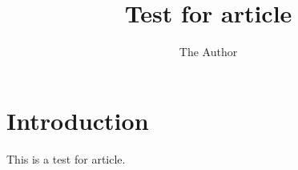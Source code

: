 \documentclass[12pt,a4paper]{amsart}
\title[Test for article]{Test for article}
\author{The Author}
\begin{document}
    \begin{abstract}
        
    \end{abstract}

    \maketitle

    \tableofcontents

    \section{Introduction}
    This is a test for article.

    
    
\end{document}
